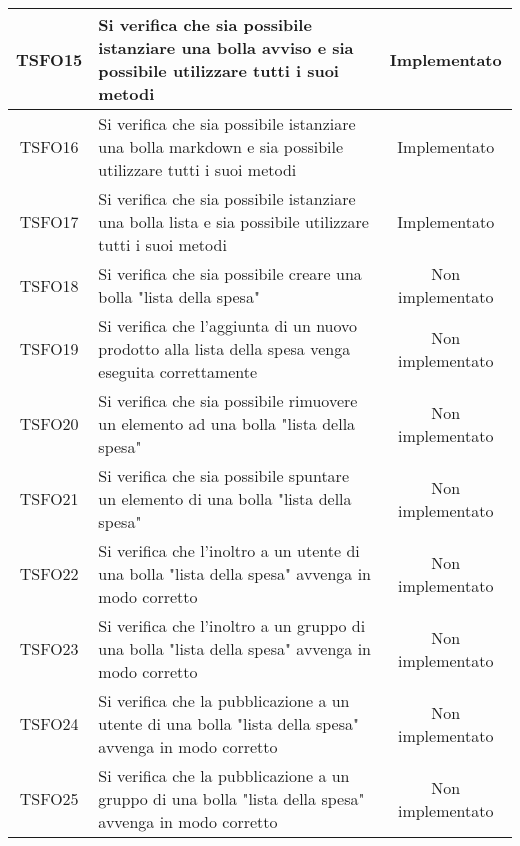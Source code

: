 \begin{center}
\begin{longtable}{|c|>{\centering}m{10cm}|c|}
		TSFO15 & Si verifica che sia possibile istanziare una bolla avviso e sia possibile utilizzare tutti i suoi metodi & Implementato \\ \hline
		TSFO16 & Si verifica che sia possibile istanziare una bolla markdown e sia possibile utilizzare tutti i suoi metodi & Implementato \\ \hline
		TSFO17 & Si verifica che sia possibile istanziare una bolla lista e sia possibile utilizzare tutti i suoi metodi & Implementato \\ \hline
		TSFO18 & Si verifica che sia possibile creare una bolla "lista della spesa" & Non implementato \\ \hline
		TSFO19 & Si verifica che l'aggiunta di un nuovo prodotto alla lista della spesa venga eseguita correttamente & Non implementato \\ \hline
		TSFO20 & Si verifica che sia possibile rimuovere un elemento ad una bolla "lista della spesa" & Non implementato \\ \hline
		TSFO21 & Si verifica che sia possibile spuntare un elemento di una bolla "lista della spesa" & Non implementato \\ \hline
		TSFO22 & Si verifica che l'inoltro a un utente di una bolla "lista della spesa" avvenga in modo corretto & Non implementato \\ \hline
		TSFO23 & Si verifica che l'inoltro a un gruppo di una bolla "lista della spesa" avvenga in modo corretto & Non implementato \\ \hline
		TSFO24 & Si verifica che la pubblicazione a un utente di una bolla "lista della spesa" avvenga in modo corretto & Non implementato \\ \hline
		TSFO25 & Si verifica che la pubblicazione a un gruppo di una bolla "lista della spesa" avvenga in modo corretto & Non implementato \\ \hline
	\end{longtable}
\end{center}
